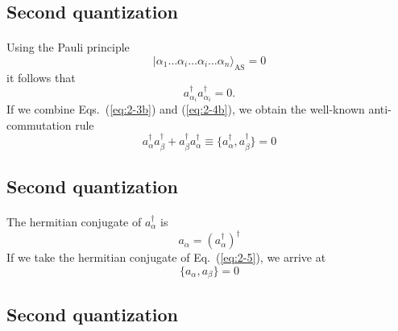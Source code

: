 \documentclass[%
twoside,                 %
final,                   %
10pt]{article}
\begin{document}
\subsection*{Second quantization}

\paragraph{}
Using the Pauli principle
\begin{equation}
	|\alpha_1\dots \alpha_i\dots \alpha_i\dots \alpha_n\rangle_{\mathrm{AS}} = 0 \label{eq:2-4a}
\end{equation}
it follows that
\begin{equation}
	a_{\alpha_i}^{\dagger}  a_{\alpha_i}^{\dagger} = 0. \label{eq:2-4b}
\end{equation}
If we combine Eqs.~(\ref{eq:2-3b}) and (\ref{eq:2-4b}), we obtain the well-known anti-commutation rule
\begin{equation}
	a_{\alpha}^{\dagger}  a_{\beta}^{\dagger} + a_{\beta}^{\dagger}  a_{\alpha}^{\dagger} \equiv 
		\{a_{\alpha}^{\dagger},a_{\beta}^{\dagger}\} = 0 \label{eq:2-5}
\end{equation}



\subsection*{Second quantization}

\paragraph{}
The hermitian conjugate  of $a_\alpha^{\dagger}$ is
\begin{equation}
	a_{\alpha} = ( a_{\alpha}^{\dagger} )^{\dagger} \label{eq:2-6}
\end{equation}
If we take the hermitian conjugate of Eq.~(\ref{eq:2-5}), we arrive at 
\begin{equation}
	\{a_{\alpha},a_{\beta}\} = 0 \label{eq:2-7}
\end{equation}




\subsection*{Second quantization}
\end{document}
